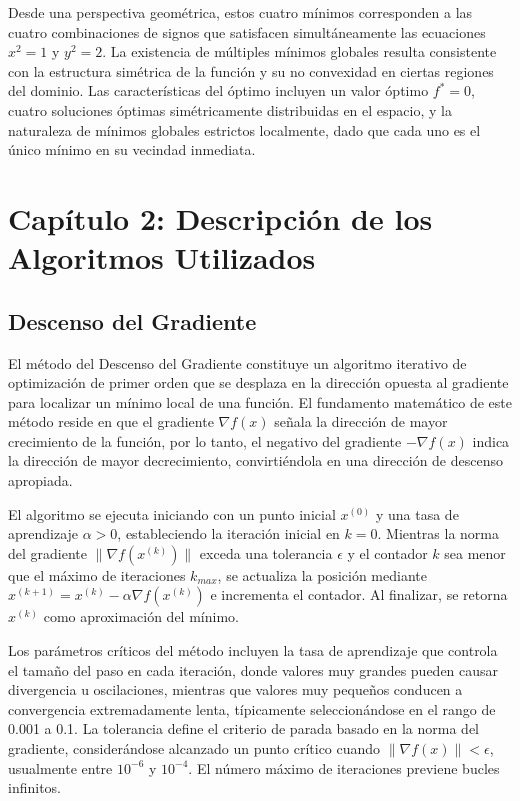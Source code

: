 \documentclass[12pt,a4paper]{article}
\begin{document}
Desde una perspectiva geométrica, estos cuatro mínimos corresponden a las cuatro combinaciones de signos que satisfacen simultáneamente las ecuaciones $x^2 = 1$ y $y^2 = 2$. La existencia de múltiples mínimos globales resulta consistente con la estructura simétrica de la función y su no convexidad en ciertas regiones del dominio. Las características del óptimo incluyen un valor óptimo $f^* = 0$, cuatro soluciones óptimas simétricamente distribuidas en el espacio, y la naturaleza de mínimos globales estrictos localmente, dado que cada uno es el único mínimo en su vecindad inmediata.

\newpage

\section*{Capítulo 2: Descripción de los Algoritmos Utilizados}

\subsection*{Descenso del Gradiente}

El método del Descenso del Gradiente constituye un algoritmo iterativo de optimización de primer orden que se desplaza en la dirección opuesta al gradiente para localizar un mínimo local de una función. El fundamento matemático de este método reside en que el gradiente $\nabla f(x)$ señala la dirección de mayor crecimiento de la función, por lo tanto, el negativo del gradiente $-\nabla f(x)$ indica la dirección de mayor decrecimiento, convirtiéndola en una dirección de descenso apropiada.

El algoritmo se ejecuta iniciando con un punto inicial $x^{(0)}$ y una tasa de aprendizaje $\alpha > 0$, estableciendo la iteración inicial en $k = 0$. Mientras la norma del gradiente $\|\nabla f(x^{(k)})\|$ exceda una tolerancia $\epsilon$ y el contador $k$ sea menor que el máximo de iteraciones $k_{max}$, se actualiza la posición mediante $x^{(k+1)} = x^{(k)} - \alpha \nabla f(x^{(k)})$ e incrementa el contador. Al finalizar, se retorna $x^{(k)}$ como aproximación del mínimo.

Los parámetros críticos del método incluyen la tasa de aprendizaje que controla el tamaño del paso en cada iteración, donde valores muy grandes pueden causar divergencia u oscilaciones, mientras que valores muy pequeños conducen a convergencia extremadamente lenta, típicamente seleccionándose en el rango de 0.001 a 0.1. La tolerancia define el criterio de parada basado en la norma del gradiente, considerándose alcanzado un punto crítico cuando $\|\nabla f(x)\| < \epsilon$, usualmente entre $10^{-6}$ y $10^{-4}$. El número máximo de iteraciones previene bucles infinitos.
\end{document}

